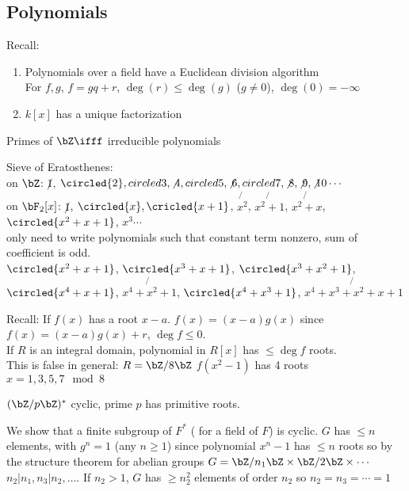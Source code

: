 
\subsection{Polynomials}

Recall: 
\begin{enumerate}
    \item Polynomials over a field have a Euclidean division algorithm \\ 
    For $f,g$, $f = gq+r$, $\deg (r) \le \deg (g)$ ($g \neq 0$), $\deg(0) = - \infty$ 
    \item $k[x]$ has a unique factorization
\end{enumerate}

\noindent
Primes of $\bZ \ifff $ irreducible polynomials 

\begin{example}
    Sieve of Eratosthenes: \\
    on $\bZ$: $\not1$, $\circled{2}, circled{3}, \not4, circled{5}, \not6, circled{7}, \not8, \not9, \not{10} \cdots$ \\
    on $\bF_2[x]$: $\not1$, $\circled{x}, \cricled{x+1}$, $\not{x^2}$, $\not{x^2+1}$, $\not{x^2+x}$, $\circled{x^2+x+1}$, $x^3 \cdots$ \\
    only need to write polynomials such that constant term nonzero, sum of coefficient is odd. \\
    $\circled{x^2+x+1}$, $\circled{x^3+x+1}$, $\circled{x^3+x^2+1}$, $\circled{x^4+x+1}$, $\not{x^4+x^2+1}$, $\circled{x^4+x^3+1}$, $\not{x^4+x^3+x^2+x+1}$ 
\end{example}

\noindent
Recall: If $f(x)$ has a root $x-a$. $f(x) = (x-a)g(x)$ since $f(x) = (x-a)g(x) + r$, $\deg f \le 0$.\\
 If $R$ is an integral domain, polynomial in $R[x]$ has $\le \deg f$ roots. \\
 This is false in general: $R = \bZ/8\bZ$ $f(x^2-1)$ has 4 roots $x=1,3,5,7 \mod 8$ \\

 \begin{corollary}
    $(\bZ/p\bZ)^*$ cyclic, prime $p$ has primitive roots. 
 \end{corollary}

 \begin{pf}
    We show that a finite subgroup of $F^*$ ( for a field of $F$) is cyclic. $G$ has $\le n$ elements, with $g^n=1$ (any $n \ge 1$) since polynomial $x^n-1$ has $\le n$ roots so by the structure theorem for abelian groups $G = \bZ/n_1\bZ \times \bZ/2\bZ \times \cdots$ $n_2|n_1, n_3|n_2, \ldots$. If $n_2 >1$, $G$ has $\ge n_2^2$ elements of order $n_2$ so $n_2 = n_3 = \cdots = 1$ 
 \end{pf}   

